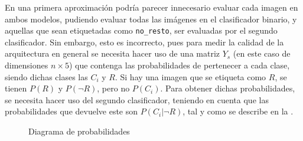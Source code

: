 				En una primera aproximación podría parecer innecesario evaluar cada imagen en ambos modelos, pudiendo evaluar todas las imágenes en el clasificador binario, y aquellas que sean etiquetadas como \texttt{no\_resto}, ser evaluadas por el segundo clasificador. Sin embargo, esto es incorrecto, pues para medir la calidad de la arquitectura en general se necesita hacer uso de una matriz $Y_s$ (en este caso de dimensiones $n \times 5$) que contenga las probabilidades de pertenecer a cada clase, siendo dichas clases las $C_i$ y $R$. Si hay una imagen que se etiqueta como $R$, se tienen $P(R)$ y $P(\lnot R)$, pero no $P(C_i)$. Para obtener dichas probabilidades, se necesita hacer uso del segundo clasificador, teniendo en cuenta que las probabilidades que devuelve este son $P(C_i|\lnot R)$, tal y como se describe en la . \\
				
				\begin{figure}[H]
					\centering
					\caption{Diagrama de probabilidades}
					\label{fig:prob}
				\end{figure}
				

